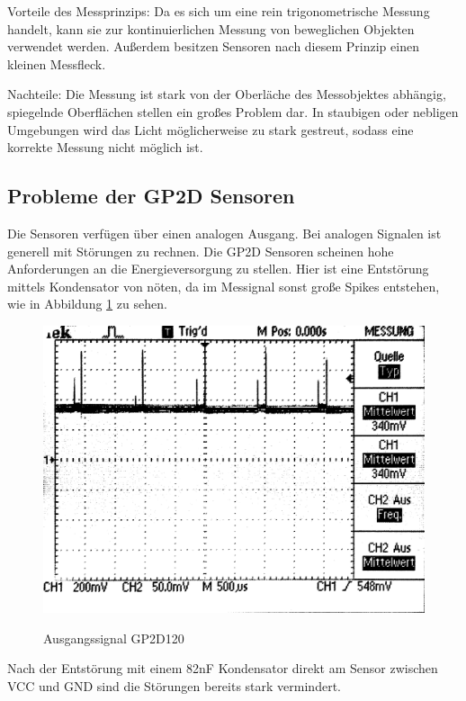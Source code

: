Vorteile des Messprinzips:
Da es sich um eine rein trigonometrische Messung handelt, kann sie zur kontinuierlichen Messung von beweglichen Objekten verwendet werden.
Außerdem besitzen Sensoren nach diesem Prinzip einen kleinen Messfleck.

Nachteile:
Die Messung ist stark von der Oberläche des Messobjektes abhängig, spiegelnde Oberflächen stellen ein großes Problem dar.
In staubigen oder nebligen Umgebungen wird das Licht möglicherweise zu stark gestreut, sodass eine korrekte Messung nicht möglich ist.

\subsection{Probleme der GP2D Sensoren}
Die Sensoren verfügen über einen analogen Ausgang. Bei analogen Signalen ist generell mit Störungen zu rechnen. Die GP2D Sensoren scheinen
hohe Anforderungen an die Energieversorgung zu stellen. Hier ist eine Entstörung mittels Kondensator von nöten, da im Messignal sonst große Spikes
entstehen, wie in Abbildung \ref{fig:IR_spikes} zu sehen.

\begin{figure}[H]
\centering
\includegraphics[width=.8\textwidth]{IR_spikes.png}\\
\caption{Ausgangssignal GP2D120}%
\label{fig:IR_spikes}
\end{figure}

Nach der Entstörung mit einem 82nF Kondensator direkt am Sensor zwischen VCC und GND sind die Störungen bereits stark vermindert.

